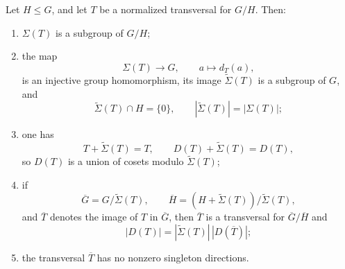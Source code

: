 \documentclass[10pt,a4paper]{amsart}
\begin{document}
\begin{proposition}
\label{prop:primitive-quotient-reduction}
Let $H\leq G$, and let $T$ be a normalized transversal for $G/H$.  Then:
\begin{enumerate}
  \item $\Sigma(T)$ is a subgroup of $G/H$;

  \item the map
  \[
    \Sigma(T)\longrightarrow G,
    \qquad a\longmapsto d_T(a),
  \]
  is an injective group homomorphism, its image $\widetilde\Sigma(T)$ is a
  subgroup of $G$, and
  \[
    \widetilde\Sigma(T)\cap H=\{0\},
    \qquad
    |\widetilde\Sigma(T)|=|\Sigma(T)|;
  \]

  \item one has
  \[
    T+\widetilde\Sigma(T)=T,
    \qquad
    D(T)+\widetilde\Sigma(T)=D(T),
  \]
  so $D(T)$ is a union of cosets modulo $\widetilde\Sigma(T)$;

  \item if
  \[
    \overline G=G/\widetilde\Sigma(T),
    \qquad
    \overline H=(H+\widetilde\Sigma(T))/\widetilde\Sigma(T),
  \]
  and $\overline T$ denotes the image of $T$ in $\overline G$, then
  $\overline T$ is a transversal for $\overline G/\overline H$ and
  \[
    |D(T)|=|\widetilde\Sigma(T)|\,|D(\overline T)|;
  \]

  \item the transversal $\overline T$ has no nonzero singleton directions.
\end{enumerate}
\end{proposition}
\end{document}
